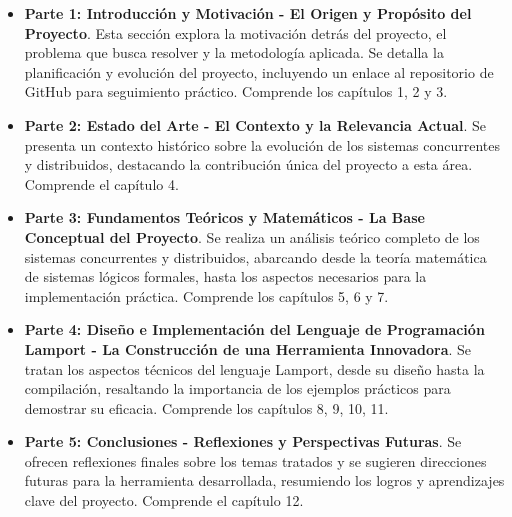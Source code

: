 \begin{itemize}
    \item \textbf{Parte 1: Introducción y Motivación - El Origen y Propósito del Proyecto}. Esta sección explora la motivación detrás del proyecto, el problema que busca resolver y la metodología aplicada. Se detalla la planificación y evolución del proyecto, incluyendo un enlace al repositorio de GitHub para seguimiento práctico. Comprende los capítulos 1, 2 y 3.
    \item \textbf{Parte 2: Estado del Arte - El Contexto y la Relevancia Actual}. Se presenta un contexto histórico sobre la evolución de los sistemas concurrentes y distribuidos, destacando la contribución única del proyecto a esta área. Comprende el capítulo 4.
    \item \textbf{Parte 3: Fundamentos Teóricos y Matemáticos - La Base Conceptual del Proyecto}. Se realiza un análisis teórico completo de los sistemas concurrentes y distribuidos, abarcando desde la teoría matemática de sistemas lógicos formales, hasta los aspectos necesarios para la implementación práctica. Comprende los capítulos 5, 6 y 7.
    \item \textbf{Parte 4: Diseño e Implementación del Lenguaje de Programación Lamport - La Construcción de una Herramienta Innovadora}. Se tratan los aspectos técnicos del lenguaje Lamport, desde su diseño hasta la compilación, resaltando la importancia de los ejemplos prácticos para demostrar su eficacia. Comprende los capítulos 8, 9, 10, 11.
    \item \textbf{Parte 5: Conclusiones - Reflexiones y Perspectivas Futuras}. Se ofrecen reflexiones finales sobre los temas tratados y se sugieren direcciones futuras para la herramienta desarrollada, resumiendo los logros y aprendizajes clave del proyecto. Comprende el capítulo 12.

    
\end{itemize}